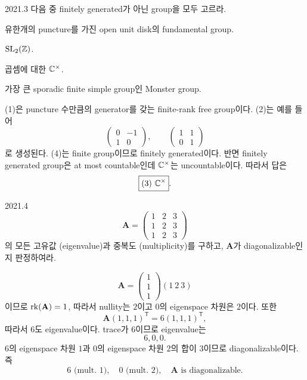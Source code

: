 \begin{pastproblem}{2021.3}
다음 중 finitely generated가 아닌 group을 모두 고르라.
\begin{problemchoices}
\item 유한개의 puncture를 가진 open unit disk의 fundamental group.
\item $\operatorname{SL}_2(\mathbb{Z})$.
\item 곱셈에 대한 $\mathbb{C}^\times$.
\item 가장 큰 sporadic finite simple group인 Monster group.
\end{problemchoices}
\end{pastproblem}

\begin{solution}
(1)은 puncture 수만큼의 generator를 갖는 finite-rank free group이다. (2)는 예를 들어
\[
\begin{pmatrix}0&-1\\1&0\end{pmatrix},\qquad
\begin{pmatrix}1&1\\0&1\end{pmatrix}
\]
로 생성된다. (4)는 finite group이므로 finitely generated이다. 반면 finitely generated group은 at most countable인데 $\mathbb{C}^\times$는 uncountable이다. 따라서 답은
\[
\boxed{(3)\ \mathbb{C}^\times}.
\]
\end{solution}

\begin{pastproblem}{2021.4}
\[
\mathbf A=
\begin{pmatrix}
1&2&3\\
1&2&3\\
1&2&3
\end{pmatrix}
\]
의 모든 고유값 (eigenvalue)과 중복도 (multiplicity)를 구하고, $\mathbf A$가 diagonalizable인지 판정하여라.
\end{pastproblem}

\begin{solution}
\[
\mathbf A=
\begin{pmatrix}1\\1\\1\end{pmatrix}(1\ 2\ 3)
\]
이므로 $\operatorname{rk}(\mathbf A)=1$, 따라서 nullity는 $2$이고 $0$의 eigenspace 차원은 $2$이다. 또한
\[
\mathbf A(1,1,1)^{\mathsf T}=6(1,1,1)^{\mathsf T},
\]
따라서 $6$도 eigenvalue이다. trace가 $6$이므로 eigenvalue는
\[
6,0,0.
\]
$6$의 eigenspace 차원 $1$과 $0$의 eigenspace 차원 $2$의 합이 $3$이므로 diagonalizable이다. 즉
\[
\boxed{6\text{ (mult. }1),\quad0\text{ (mult. }2),\quad\mathbf A\text{ is diagonalizable}}.
\]
\end{solution}

